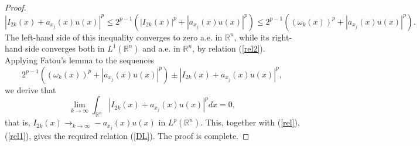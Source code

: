 \documentclass[10pt,a4paper]{amsart}
\newcommand{\R}{{\mathbb R}}
\begin{document}
\begin{proof}
\[
|I_{2k}(x)+a_{x_j}(x)u(x)|^p\le 2^{p-1}(|I_{2k}(x)|^p+|a_{x_j}(x)u(x)|^p)\le 2^{p-1}((\omega_k(x))^p+|a_{x_j}(x)u(x)|^p).\]
The left-hand side of this inequality converges to zero a.e. in $\R^n$, while its right-hand side converges both in  $L^1(\R^n)$ and a.e. in $\R^n$, by relation (\ref{rel2}). Applying Fatou's lemma to the sequences
\[
2^{p-1}((\omega_k(x))^p+|a_{x_j}(x)u(x)|^p)\pm |I_{2k}(x)+a_{x_j}(x)u(x)|^p,
\]
we derive that
\[
\lim_{k\to\infty} \int_{\R^n}|I_{2k}(x)+a_{x_j}(x)u(x)|^pdx=0,
\]
that is, $\displaystyle I_{2k}(x)\mathop{\to}_{k\to\infty} -a_{x_j}(x)u(x)$ in $L^p(\R^n)$. This, together with  (\ref{rel}), (\ref{rel1}), gives the required relation (\ref{DL}). The proof is complete.
\end{proof}
\end{document}
